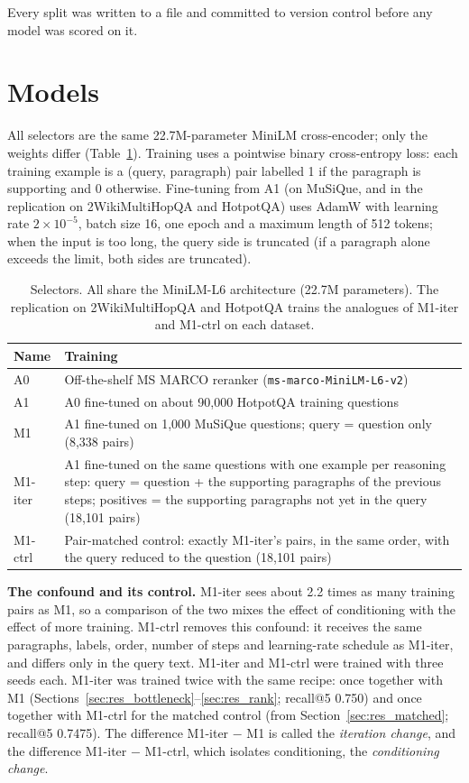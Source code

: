 Every split was written to a file and committed to version control before any model was scored on it.

\section{Models}
\label{sec:method_models}

All selectors are the same 22.7M-parameter MiniLM cross-encoder; only the weights differ (Table~\ref{tab:models}). Training uses a pointwise binary cross-entropy loss: each training example is a (query, paragraph) pair labelled 1 if the paragraph is supporting and 0 otherwise. Fine-tuning from A1 (on MuSiQue, and in the replication on 2WikiMultiHopQA and HotpotQA) uses AdamW with learning rate $2\times10^{-5}$, batch size 16, one epoch and a maximum length of 512 tokens; when the input is too long, the query side is truncated (if a paragraph alone exceeds the limit, both sides are truncated).

\begin{table}[htbp]
\centering
\caption{Selectors. All share the MiniLM-L6 architecture (22.7M parameters). The replication on 2WikiMultiHopQA and HotpotQA trains the analogues of M1-iter and M1-ctrl on each dataset.}
\label{tab:models}
\small
\begin{tabularx}{\textwidth}{l>{\raggedright\arraybackslash}X}
\toprule
Name & Training \\
\midrule
A0 & Off-the-shelf MS MARCO reranker (\texttt{ms-marco-MiniLM-L6-v2}) \\
A1 & A0 fine-tuned on about 90,000 HotpotQA training questions \\
M1 & A1 fine-tuned on 1,000 MuSiQue questions; query = question only (8,338 pairs) \\
M1-iter & A1 fine-tuned on the same questions with one example per reasoning step: query = question + the supporting paragraphs of the previous steps; positives = the supporting paragraphs not yet in the query (18,101 pairs) \\
M1-ctrl & Pair-matched control: exactly M1-iter's pairs, in the same order, with the query reduced to the question (18,101 pairs) \\
\bottomrule
\end{tabularx}
\end{table}

\textbf{The confound and its control.} M1-iter sees about 2.2 times as many training pairs as M1, so a comparison of the two mixes the effect of conditioning with the effect of more training. M1-ctrl removes this confound: it receives the same paragraphs, labels, order, number of steps and learning-rate schedule as M1-iter, and differs only in the query text. M1-iter and M1-ctrl were trained with three seeds each. M1-iter was trained twice with the same recipe: once together with M1 (Sections~\ref{sec:res_bottleneck}--\ref{sec:res_rank}; recall@5 0.750) and once together with M1-ctrl for the matched control (from Section~\ref{sec:res_matched}; recall@5 0.7475). The difference M1-iter $-$ M1 is called the \emph{iteration change}, and the difference M1-iter $-$ M1-ctrl, which isolates conditioning, the \emph{conditioning change}.

